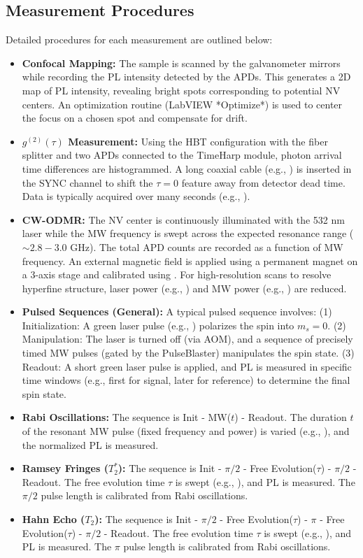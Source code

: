 \documentclass[aps,prb,twocolumn,superscriptaddress,floatfix,longbibliography,citeautoscript]{revtex4-2}
\begin{document}
\subsection{\label{sec:procedures}Measurement Procedures}
Detailed procedures for each measurement are outlined below:
\begin{itemize}
    \item \textbf{Confocal Mapping:} The sample is scanned by the galvanometer mirrors while recording the PL intensity detected by the APDs. This generates a 2D map of PL intensity, revealing bright spots corresponding to potential NV centers. An optimization routine (LabVIEW *Optimize*) is used to center the focus on a chosen spot and compensate for drift.
    \item \textbf{$g^{(2)}(\tau)$ Measurement:} Using the HBT configuration with the fiber splitter and two APDs connected to the TimeHarp module, photon arrival time differences are histogrammed. A long coaxial cable (e.g., ) is inserted in the SYNC channel to shift the $\tau=0$ feature away from detector dead time. Data is typically acquired over many seconds (e.g., ).
    \item \textbf{CW-ODMR:} The NV center is continuously illuminated with the 532 nm laser while the MW frequency is swept across the expected resonance range ($\sim 2.8 - 3.0$ GHz). The total APD counts are recorded as a function of MW frequency. An external magnetic field is applied using a permanent magnet on a 3-axis stage and calibrated using . For high-resolution scans to resolve hyperfine structure, laser power (e.g., ) and MW power (e.g., ) are reduced.
    \item \textbf{Pulsed Sequences (General):} A typical pulsed sequence involves: (1) Initialization: A green laser pulse (e.g., ) polarizes the spin into $m_s=0$. (2) Manipulation: The laser is turned off (via AOM), and a sequence of precisely timed MW pulses (gated by the PulseBlaster) manipulates the spin state. (3) Readout: A short green laser pulse is applied, and PL is measured in specific time windows (e.g., first  for signal, later  for reference) to determine the final spin state.
    \item \textbf{Rabi Oscillations:} The sequence is Init - MW($t$) - Readout. The duration $t$ of the resonant MW pulse (fixed frequency and power) is varied (e.g., ), and the normalized PL is measured.
    \item \textbf{Ramsey Fringes ($T_2^*$):} The sequence is Init - $\pi/2$ - Free Evolution($\tau$) - $\pi/2$ - Readout. The free evolution time $\tau$ is swept (e.g., ), and PL is measured. The $\pi/2$ pulse length is calibrated from Rabi oscillations.
    \item \textbf{Hahn Echo ($T_2$):} The sequence is Init - $\pi/2$ - Free Evolution($\tau$) - $\pi$ - Free Evolution($\tau$) - $\pi/2$ - Readout. The free evolution time $\tau$ is swept (e.g., ), and PL is measured. The $\pi$ pulse length is calibrated from Rabi oscillations.
\end{itemize}
\end{document}

